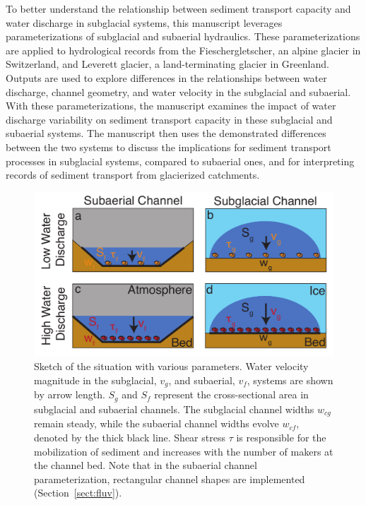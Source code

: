 \documentclass[draft]{agujournal2019}
\begin{document}
To better understand the relationship between sediment transport capacity and water discharge in subglacial systems, this manuscript leverages parameterizations of subglacial and subaerial hydraulics.
These parameterizations are applied to hydrological records from the Fieschergletscher, an alpine glacier in Switzerland, and Leverett glacier,  a land-terminating glacier in Greenland.
Outputs are used to explore differences in the relationships between  water discharge, channel geometry, and water velocity in the subglacial and subaerial. 
With these parameterizations, the manuscript examines the impact of water discharge variability on sediment transport capacity in these subglacial and subaerial systems.
The manuscript then uses the demonstrated differences between the two systems to discuss the implications for sediment transport processes in subglacial systems, compared to subaerial ones, and for interpreting records of sediment transport from glacierized catchments.

\begin{center}
  \begin{figure}[H]
    \includegraphics[width=0.8\linewidth]{Fig1.pdf}
    \caption{Sketch of the situation with various parameters. Water velocity magnitude in the subglacial, $v_g$, and subaerial, $v_f$, systems are shown by arrow length. $S_g$ and $S_f$ represent the cross-sectional area in subglacial and subaerial channels. The subglacial channel widths $w_{cg}$ remain steady, while the subaerial channel widths evolve $w_{cf}$, denoted by the thick black line. Shear stress $\tau$ is responsible for the mobilization of sediment and increases with the number of makers at the channel bed. 
      Note that in the subaerial channel parameterization, rectangular channel shapes are implemented (Section~\ref{sect:fluv}).} 
    \label{fig:cartoon}
  \end{figure}
\end{center}
\end{document}
